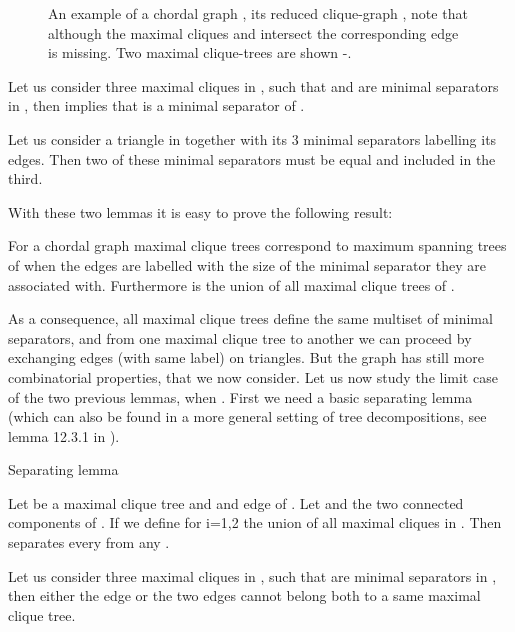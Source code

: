 \documentclass{endm}
\begin{document}
\begin{figure}[h!]
	\begin{center}
		\quad\quad
		\subfigure[][]{\label{fig:ex-b}\texttt{[image: ExCliqueGraph]}}
		\quad\quad
		\subfigure[][]{\label{fig:ex-c}\texttt{[image: ExCliqueTree1]}}
		\quad\quad
	\caption{An example of a chordal graph , its reduced clique-graph , note that although the maximal cliques  and  intersect the corresponding edge is missing. Two maximal clique-trees are shown -.}
	\label{fig:}
	\end{center}
\end{figure}



\begin{lemma}\cite{GHP95}
Let us consider three maximal cliques  in  ,  such that     and  are minimal separators in , then 
  implies that   is a minimal separator of .
\end{lemma}

\begin{lemma} \cite{GHP95}
Let us consider  a triangle in  together with its 3 minimal separators labelling its edges. Then two of these minimal separators must be equal and included in the third.
\end{lemma}

With these two lemmas it is easy to prove the following result:
\begin{proposition}\cite{BP93,GHP95}
For a chordal graph  maximal clique trees correspond to maximum spanning trees of  when the edges are labelled with the size of the minimal separator they are associated with. Furthermore  is the union of all maximal clique trees of . 
\end{proposition}

As a consequence, all maximal clique trees define the same multiset of minimal separators, and from one maximal clique tree to another we can proceed by exchanging edges (with same label) on triangles.
But the graph  has still more combinatorial properties, that we now consider.
Let us now study the limit case of the two previous lemmas, when . First we need a basic separating  lemma (which can also be found in a more general setting of tree decompositions, see  lemma 12.3.1 in \cite{D97}).

\begin{lemma}\label{separating} Separating lemma

Let  be a maximal clique tree and  and edge of . Let   and  the two connected components of . If we define  for i=1,2  the union of all maximal cliques in . Then  separates every  from any .
\end{lemma}
\begin{lemma}
Let us consider three maximal cliques  in  ,  such that   are minimal separators in , then  either  the edge  or  the two edges  cannot belong both
to a same  maximal clique tree.
 \end{lemma}
\end{document}
